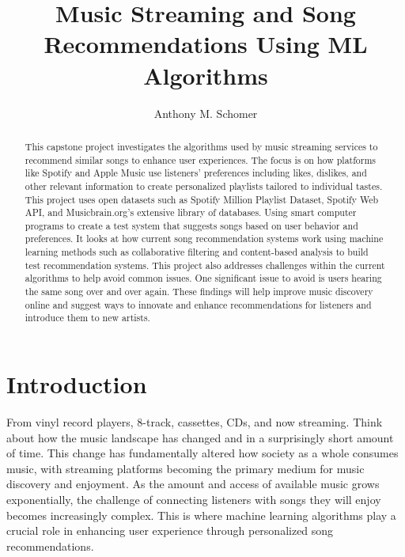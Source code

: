 \documentclass[runningheads]{llncs}
\begin{document}
\title{Music Streaming and Song Recommendations Using ML Algorithms}

\author{Anthony M. Schomer}



\maketitle

\begin{abstract}
This capstone project investigates the algorithms used by music streaming services to recommend similar songs to enhance user experiences. The focus is on how platforms like Spotify and Apple Music use listeners' preferences including likes, dislikes, and other relevant information to create personalized playlists tailored to individual tastes. This project uses open datasets such as Spotify Million Playlist Dataset, Spotify Web API, and Musicbrain.org's extensive library of databases. Using smart computer programs to create a test system that suggests songs based on user behavior and preferences. It looks at how current song recommendation systems work using machine learning methods such as collaborative filtering and content-based analysis to build test recommendation systems. This project also addresses challenges within the current algorithms to help avoid common issues. One significant issue to avoid is users hearing the same song over and over again. These findings will help improve music discovery online and suggest ways to innovate and enhance recommendations for listeners and introduce them to new artists.

\end{abstract}

\section{Introduction}

From vinyl record players, 8-track, cassettes, CDs, and now streaming. Think about how the music landscape has changed and in a surprisingly short amount of time. This change has fundamentally altered how society as a whole consumes music, with streaming platforms becoming the primary medium for music discovery and enjoyment. As the amount and access of available music grows exponentially, the challenge of connecting listeners with songs they will enjoy becomes increasingly complex. This is where machine learning algorithms play a crucial role in enhancing user experience through personalized song recommendations.
\end{document}
